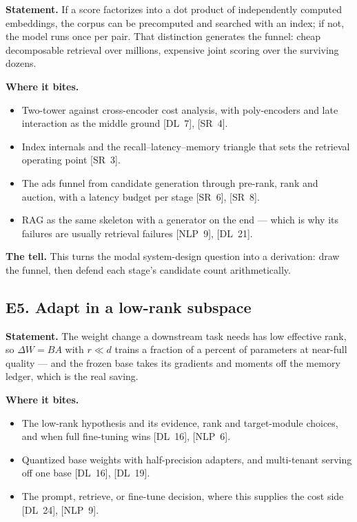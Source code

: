 \textbf{Statement.} If a score factorizes into a dot product of independently computed embeddings, the corpus can be precomputed and searched with an index; if not, the model runs once per pair. That distinction generates the funnel: cheap decomposable retrieval over millions, expensive joint scoring over the surviving dozens.

\textbf{Where it bites.}
\begin{itemize}[itemsep=1pt,topsep=2pt,leftmargin=1.3em]
\item Two-tower against cross-encoder cost analysis, with poly-encoders and late interaction as the middle ground [DL~7], [SR~4].
\item Index internals and the recall--latency--memory triangle that sets the retrieval operating point [SR~3].
\item The ads funnel from candidate generation through pre-rank, rank and auction, with a latency budget per stage [SR~6], [SR~8].
\item RAG as the same skeleton with a generator on the end --- which is why its failures are usually retrieval failures [NLP~9], [DL~21].
\end{itemize}

\textbf{The tell.} This turns the modal system-design question into a derivation: draw the funnel, then defend each stage's candidate count arithmetically.

\subsection*{E5. Adapt in a low-rank subspace}

\textbf{Statement.} The weight change a downstream task needs has low effective rank, so $\Delta W = BA$ with $r \ll d$ trains a fraction of a percent of parameters at near-full quality --- and the frozen base takes its gradients and moments off the memory ledger, which is the real saving.

\textbf{Where it bites.}
\begin{itemize}[itemsep=1pt,topsep=2pt,leftmargin=1.3em]
\item The low-rank hypothesis and its evidence, rank and target-module choices, and when full fine-tuning wins [DL~16], [NLP~6].
\item Quantized base weights with half-precision adapters, and multi-tenant serving off one base [DL~16], [DL~19].
\item The prompt, retrieve, or fine-tune decision, where this supplies the cost side [DL~24], [NLP~9].
\end{itemize}

